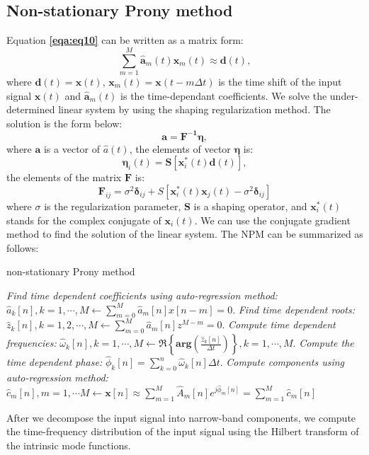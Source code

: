 \subsection{Non-stationary Prony method}
Equation \textbf{\ref{eqa:eq10}} can be written as a matrix form:
\begin{equation}
    \label{eqa:eq19}
    \sum_{m=1}^{M}\mathbf{\hat{a}}_m(t)\mathbf{x}_m(t) \approx \mathbf{d}(t),
\end{equation}
where $\mathbf{d}(t) = \mathbf{x}(t)$, $\mathbf{x}_m(t) = \mathbf{x}(t-m\Delta t)$ is the time shift
of the input signal $\mathbf{x}(t)$ and $\mathbf{\hat{a}}_m(t)$ is the time-dependant coefficients.
We solve the under-determined linear system by using the shaping regularization method.
The solution is the form below:
\begin{equation}
    \label{eqa:eq20}
    \mathbf{a = F^{-1}\eta},
\end{equation}
where $\mathbf{a}$ is a vector of $\hat{a}(t)$, the elements of vector $\mathbf{\eta}$ is:
\begin{equation}
    \label{eqa:eq21}
    \mathbf{\eta}_i(t) = \mathbf{S}\left[\mathbf{x}_i^*(t)\mathbf{d}(t)\right],
\end{equation}
the elements of the matrix $\mathbf{F}$ is:
\begin{equation}
    \label{eqa:eq22}
    \mathbf{F}_{ij}= \sigma^2 \mathbf{\delta}_{ij} + S[\mathbf{x}_i^*(t)\mathbf{x}_j(t) - \sigma^2 \mathbf{\delta}_{ij}]
\end{equation}
where $\sigma$ is the regularization parameter, $\mathbf{S}$ is a shaping operator,
and $\mathbf{x}_i^*(t)$ stands for the complex conjugate of $\mathbf{x}_i(t)$.
We can use the conjugate gradient method to find the solution of the linear system.
The NPM \cite[]{fomel2013} can be summarized as follows:
\begin{algorithm}
    \caption{non-stationary Prony method} 
    \label{pro:nopronyalgorithm}
  \begin{algorithmic}[1]
      \State \textit{Find time dependent coefficients using auto-regression method:} 
        $\displaystyle \hat{a}_k[n],k=1,\cdots,M \gets \sum_{m=0}^{M}\hat{a}_m[n]x[n-m] = 0.$
      \State \textit{Find time dependent roots:} 
         $\displaystyle \hat{z}_k[n],k=1,2,\cdots,M \gets \sum_{m=0}^{M}\hat{a}_m[n]z^{M-m}= 0.$
      \State \textit{Compute time dependent frequencies:}
         $\displaystyle \hat{\omega}_k[n], k=1,\cdots,M\gets\Re\left\{\mathbf{arg}\left(\frac{\hat{z}_k[n]}{\Delta t}\right)\right\}, k=1,\cdots,M.$
      \State \textit{Compute the time dependent phase:} 
       $\displaystyle \hat{\phi}_k[n] = \sum_{k=0}^{n}\hat{\omega}_k[n]\Delta t.$ 
      \State \textit{Compute components using auto-regression method:} 
        $\displaystyle \hat{c}_m[n], m=1,\cdots M \gets \mathbf{x}[n] \approx \sum_{m=1}^M \hat{A}_m[n]e^{j\hat{\phi}_m[n]}=\sum_{m=1}^M\hat{c}_m[n]$
  \end{algorithmic}
\end{algorithm}
After we decompose the input signal into narrow-band components, 
we compute the time-frequency distribution of the input signal 
using the Hilbert transform of the intrinsic mode functions.

\newpage



